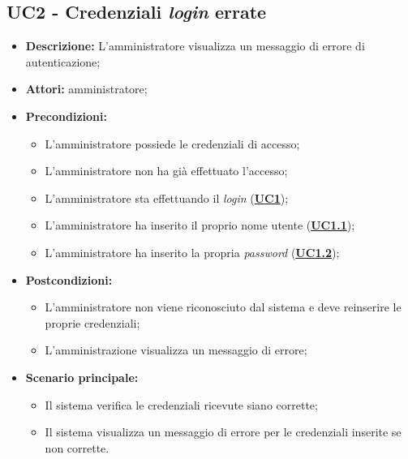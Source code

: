 \subsection{UC2 - Credenziali \textit{login} errate}
\label{sec:UC2}
\begin{itemize}
	\item \textbf{Descrizione:} L’amministratore visualizza un messaggio di errore di autenticazione;
	\item \textbf{Attori:} amministratore;
	\item \textbf{Precondizioni:} 
	\begin{itemize}
		\item L’amministratore possiede le credenziali di accesso;
		\item L’amministratore non ha già effettuato l’accesso;
		\item L’amministratore sta effettuando il \textit{login} (\hyperref[sec:UC1]{\textbf{UC1}});
		\item L’amministratore ha inserito il proprio nome utente (\hyperref[sec:UC1.1]{\textbf{UC1.1}});
		\item L’amministratore ha inserito la propria \textit{password} (\hyperref[sec:UC1.2]{\textbf{UC1.2}});
	\end{itemize}
	\item \textbf{Postcondizioni:}
	\begin{itemize}
		\item L’amministratore non viene riconosciuto dal sistema e deve reinserire le proprie credenziali;
		\item L'amministrazione visualizza un messaggio di errore;
	\end{itemize}
	\item \textbf{Scenario principale:} 
	\begin{itemize}
		\item Il sistema verifica le credenziali ricevute siano corrette;
		\item Il sistema visualizza un messaggio di errore per le credenziali inserite se non corrette.
	\end{itemize}
\end{itemize}

